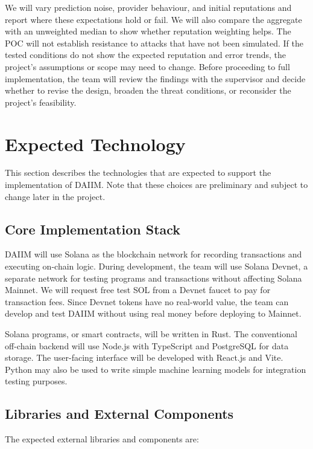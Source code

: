 \documentclass{article}
\begin{document}
We will vary prediction noise, provider behaviour, and initial reputations and report where these expectations hold or fail. We will also compare the aggregate with an unweighted median to show whether reputation weighting helps. The POC will not establish resistance to attacks that have not been simulated. If the tested conditions do not show the expected reputation and error trends, the project's assumptions or scope may need to change. Before proceeding to full implementation, the team will review the findings with the supervisor and decide whether to revise the design, broaden the threat conditions, or reconsider the project's feasibility.

\section{Expected Technology}

This section describes the technologies that are expected to support the
implementation of DAIIM. Note that these choices are preliminary and subject to change later in the project.

\subsection{Core Implementation Stack}

DAIIM will use Solana as the blockchain network for recording transactions and
executing on-chain logic. During development, the team will use Solana Devnet,
a separate network for testing programs and transactions without affecting
Solana Mainnet. We will request free test SOL from a Devnet faucet to pay for
transaction fees. Since Devnet tokens have no real-world value, the team can
develop and test DAIIM without using real money before deploying to Mainnet.

Solana programs, or smart contracts, will be written in Rust. The conventional
off-chain backend will use Node.js with TypeScript and PostgreSQL for data
storage. The user-facing interface will be developed with React.js and Vite. 
Python may also be used to write simple machine learning models for integration
testing purposes.

\subsection{Libraries and External Components}

The expected external libraries and components are:
\end{document}
